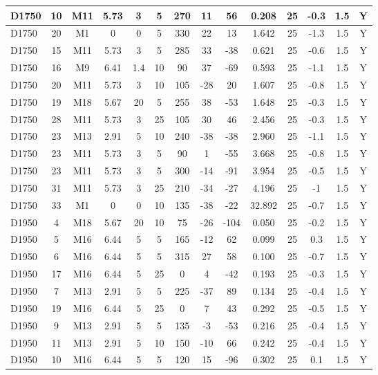 \documentclass{article}
\begin{document}
\begin{center}
\begin{longtable}{|l|c|c|c|c|c|c|c|c|c|c|c|c|c|}
D1750	&	10	&	M11	&	5.73	&	3	&	5	&	270	&	11	&	56	&	0.208	&	25	&	-0.3	&	1.5	&	Y	\\\hline
D1750	&	20	&	M1	&	0	&	0	&	5	&	330	&	22	&	13	&	1.642	&	25	&	-1.3	&	1.5	&	Y	\\\hline
D1750	&	15	&	M11	&	5.73	&	3	&	5	&	285	&	33	&	-38	&	0.621	&	25	&	-0.6	&	1.5	&	Y	\\\hline
D1750	&	16	&	M9	&	6.41	&	1.4	&	10	&	90	&	37	&	-69	&	0.593	&	25	&	-1.1	&	1.5	&	Y	\\\hline
D1750	&	20	&	M11	&	5.73	&	3	&	10	&	105	&	-28	&	20	&	1.607	&	25	&	-0.8	&	1.5	&	Y	\\\hline
D1750	&	19	&	M18	&	5.67	&	20	&	5	&	255	&	38	&	-53	&	1.648	&	25	&	-0.3	&	1.5	&	Y	\\\hline
D1750	&	28	&	M11	&	5.73	&	3	&	25	&	105	&	30	&	46	&	2.456	&	25	&	-0.3	&	1.5	&	Y	\\\hline
D1750	&	23	&	M13	&	2.91	&	5	&	10	&	240	&	-38	&	-38	&	2.960	&	25	&	-1.1	&	1.5	&	Y	\\\hline
D1750	&	23	&	M11	&	5.73	&	3	&	5	&	90	&	1	&	-55	&	3.668	&	25	&	-0.8	&	1.5	&	Y	\\\hline
D1750	&	23	&	M11	&	5.73	&	3	&	5	&	300	&	-14	&	-91	&	3.954	&	25	&	-0.5	&	1.5	&	Y	\\\hline
D1750	&	31	&	M11	&	5.73	&	3	&	25	&	210	&	-34	&	-27	&	4.196	&	25	&	-1	&	1.5	&	Y	\\\hline
D1750	&	33	&	M1	&	0	&	0	&	10	&	135	&	-38	&	-22	&	32.892	&	25	&	-0.7	&	1.5	&	Y	\\\hline
D1950	&	4	&	M18	&	5.67	&	20	&	10	&	75	&	-26	&	-104	&	0.050	&	25	&	-0.2	&	1.5	&	Y	\\\hline
D1950	&	5	&	M16	&	6.44	&	5	&	5	&	165	&	-12	&	62	&	0.099	&	25	&	0.3	&	1.5	&	Y	\\\hline
D1950	&	6	&	M16	&	6.44	&	5	&	5	&	315	&	27	&	58	&	0.100	&	25	&	-0.7	&	1.5	&	Y	\\\hline
D1950	&	17	&	M16	&	6.44	&	5	&	25	&	0	&	4	&	-42	&	0.193	&	25	&	-0.3	&	1.5	&	Y	\\\hline
D1950	&	7	&	M13	&	2.91	&	5	&	5	&	225	&	-37	&	89	&	0.134	&	25	&	-0.4	&	1.5	&	Y	\\\hline
D1950	&	19	&	M16	&	6.44	&	5	&	25	&	0	&	7	&	43	&	0.292	&	25	&	-0.5	&	1.5	&	Y	\\\hline
D1950	&	9	&	M13	&	2.91	&	5	&	5	&	135	&	-3	&	-53	&	0.216	&	25	&	-0.4	&	1.5	&	Y	\\\hline
D1950	&	11	&	M13	&	2.91	&	5	&	10	&	150	&	-10	&	66	&	0.242	&	25	&	-0.4	&	1.5	&	Y	\\\hline
D1950	&	10	&	M16	&	6.44	&	5	&	5	&	120	&	15	&	-96	&	0.302	&	25	&	0.1	&	1.5	&	Y	\\\hline

\end{longtable}
\end{center}
\end{document}
